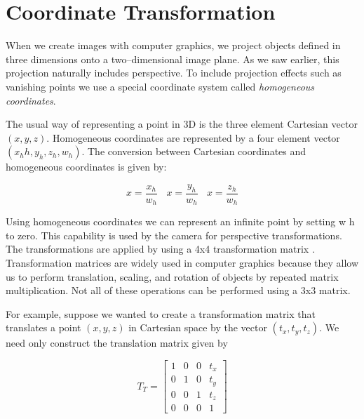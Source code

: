 \section{Coordinate Transformation}

When we create images with computer graphics, we project objects defined in three dimensions onto a two--dimensional image plane. As we saw earlier, this projection naturally includes perspective. To include projection effects such as vanishing points we use a special coordinate system called \emph{homogeneous coordinates}.

The usual way of representing a point in 3D is the three element Cartesian vector $(x, y, z)$. Homogeneous coordinates are represented by a four element vector $( x_hh, y_h, z_h, w_h )$. The conversion between Cartesian coordinates and homogeneous coordinates is given by:

\begin{equation}\label{eq:3.5}
x = \frac{x_h}{w_h}\ \ \ \  x = \frac{y_h}{w_h}\ \ \ \ x = \frac{z_h}{w_h}
\end{equation}

Using homogeneous coordinates we can represent an infinite point by setting w h to zero. This capability is used by the camera for perspective transformations. The transformations are applied by using a 4x4 transformation matrix . Transformation matrices are widely used in computer graphics because they allow us to perform translation, scaling, and rotation of objects by repeated matrix multiplication. Not all of these operations can be performed using a 3x3 matrix.

For example, suppose we wanted to create a transformation matrix that translates a point $( x, y, z)$ in Cartesian space by the vector $( t_x , t_y, t_z)$. We need only construct the translation matrix given by

\begin{equation}\label{eq:3.6}
T_T = \left[\begin{array}{cccc}
1 & 0 & 0 & t_x       \\
0 & 1 & 0 & t_y      \\
0 & 0 & 1 & t_z      \\
0 & 0 & 0 & 1
\end{array}\right]
\end{equation}

